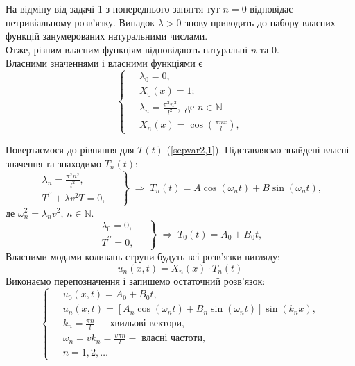 На відміну від задачі 1 з попереднього заняття тут $n = 0$ відповідає нетривіальному розв'язку. Випадок $\lambda > 0$ знову приводить до набору власних функцій занумерованих натуральними числами.\\
Отже, різним власним функціям відповідають натуральні $n$ та $0$.\\
    Власними значеннями і власними функціями є
    \begin{equation} \label{ShLsol2,1}
        \left\{ \begin{aligned}
            &\lambda_0 = 0,\\
            &X_0(x) = 1;\\
            \;&\lambda_n = \frac{\pi^2 n^2}{l^2}, \text{ де } n \in \mathbb{N}\\ 
            &X_n(x) = \cos\left(\frac{\pi n x}{l}\right),
        \end{aligned} \right.
    \end{equation}

Повертаємося до рівняння для $T(t)$ (\ref{sepvar2,1}). Підставляємо знайдені власні значення та знаходимо $T_n(t)$:
\begin{equation*}
    \left. \begin{aligned}
        \lambda_n = \frac{\pi^2 n^2}{l^2},&\;\\ 
        T^{\prime\prime} + \lambda v^2T = 0,&
    \end{aligned} \right\}
    \;\Rightarrow\;
    T_n(t) = A\cos(\omega_n t) + B\sin(\omega_n t),
\end{equation*}
де $\omega_n^2 = \lambda_n v^2, \, n \in \mathbb{N}.$\\
\begin{equation*}
    \left. \begin{aligned}
        \lambda_0 = 0,&\;\\ 
        T^{\prime\prime} = 0,&
    \end{aligned} \right\}
    \;\Rightarrow\;
    T_0(t) = A_0 + B_0 t,
\end{equation*}
Власними модами коливань струни будуть всі розв'язки вигляду:
\begin{equation*}
    u_n(x,t) = X_n(x) \cdot T_n(t)
\end{equation*}
Виконаємо перепозначення і запишемо остаточний розв'язок:
\begin{equation}
    \left\{ \begin{aligned} \label{mode2,1}
        \;&u_0(x,t) = A_0 + B_0 t, \\
        &u_n(x,t) = \left[A_n\cos(\omega_n t) + B_n\sin(\omega_n t)\right] \sin(k_n x), \\
        &k_n = \frac{\pi n}{l} - \text{ хвильові вектори}, \\
        &\omega_n = vk_n = \frac{v \pi n}{l} - \text{ власні частоти}, \\
        &n = 1, 2,\ldots
    \end{aligned}\right.
\end{equation}


